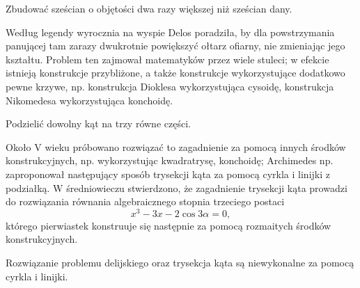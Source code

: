 \begin{problem}
    Zbudować sześcian o objętości dwa razy większej niż sześcian dany.
\end{problem}

Według legendy wyrocznia na wyspie Delos poradziła, by dla powstrzymania panującej tam zarazy dwukrotnie powiększyć ołtarz ofiarny, nie zmieniając jego kształtu.
Problem ten zajmował matematyków przez wiele stuleci; w efekcie istnieją konstrukcje przybliżone, a także konstrukcje wykorzystujące dodatkowo pewne krzywe, np. konstrukcja Dioklesa wykorzystująca cysoidę, konstrukcja Nikomedesa wykorzystująca konchoidę.

\begin{problem}
    Podzielić dowolny kąt na trzy równe części.
\end{problem}

Około V wieku próbowano rozwiązać to zagadnienie za pomocą innych środków konstrukcyjnych, np. wykorzystując kwadratrysę, konchoidę; Archimedes np. zaproponował następujący sposób trysekcji kąta za pomocą cyrkla i linijki z podziałką.
W średniowieczu stwierdzono, że zagadnienie trysekcji kąta prowadzi do rozwiązania równania algebraicznego stopnia trzeciego postaci
\begin{equation}
    x^3 - 3 x - 2 \cos 3\alpha = 0,
\end{equation}
którego pierwiastek konstruuje się następnie za pomocą rozmaitych środków konstrukcyjnych.

\begin{proposition}
    Rozwiązanie problemu delijskiego oraz trysekcja kąta są niewykonalne za pomocą cyrkla i linijki.
\end{proposition}

